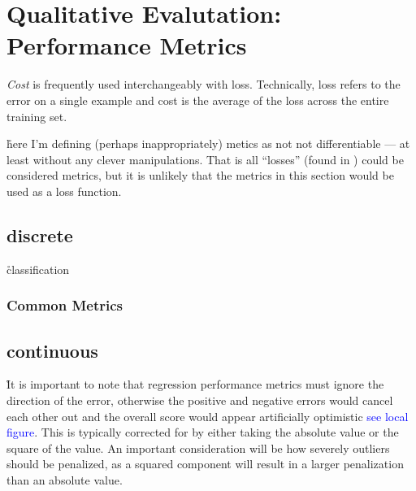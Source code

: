 \section{Qualitative Evalutation: Performance Metrics}



\emph{Cost} is frequently used interchangeably with loss. Technically, loss refers to the error on a single example and cost is the average of the loss across the entire training set.


\r{here I'm defining (perhaps inappropriately) metics as not not differentiable --- at least without any clever manipulations.  That is all ``losses'' (found in ) could be considered metrics, but it is unlikely that the metrics in this section would be used as a loss function.}



\subsection{discrete}

\r{classification}


\subsubsection{Common Metrics}




\subsection{continuous}


\r{It is important to note that regression performance metrics must ignore the direction of the error, otherwise the positive and negative errors would cancel each other out and the overall score would appear artificially optimistic \textcolor{blue}{see local figure}. This is typically corrected for by either taking the absolute value or the square of the value. An important consideration will be how severely outliers should be penalized, as a squared component will result in a larger penalization than an absolute value.}

